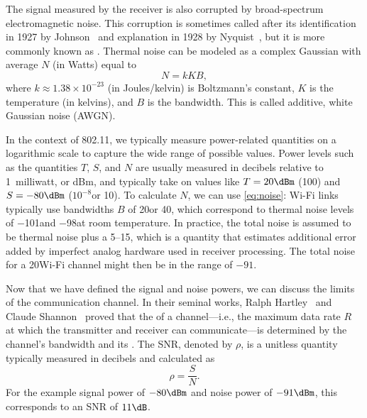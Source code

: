 The signal measured by the receiver is also corrupted by broad-spectrum electromagnetic noise. This corruption is sometimes called  after its identification in 1927 by Johnson~\cite{Johnson_noise} and explanation in 1928 by Nyquist~\cite{Nyquist_noise}, but it is more commonly known as . Thermal noise can be modeled as a complex Gaussian with average  $N$ (in Watts) equal to
\begin{equation}
\label{eq:noise}
N = kKB,
\end{equation}
where $k\approx1.38\times10^{-23}$ (in Joules/kelvin) is Boltzmann's constant, $K$ is the temperature (in kelvins), and $B$ is the bandwidth. This is called additive, white Gaussian noise (AWGN).

In the context of 802.11, we typically measure power-related quantities on a logarithmic scale to capture the wide range of possible values. Power levels such as the quantities $T$, $S$, and $N$ are usually measured in decibels relative to 1~milliwatt, or dBm, and typically take on values like $T=20\dBm$ (100\mW) and $S=-80\dBm$ ($10^{-8}$\mW or 10\pW). To calculate $N$, we can use \eqref{eq:noise}: Wi-Fi links typically use bandwidths $B$ of 20\MHz or 40\MHz, which correspond to thermal noise levels of $-$101\dBm and $-$98\dBm at room temperature. In practice, the total noise is assumed to be thermal noise plus a 5\dB--15\dB {}, which is a quantity that estimates additional error added by imperfect analog hardware used in receiver processing. The total noise for a 20\MHz Wi-Fi channel might then be in the range of $-91$\dBm.

Now that we have defined the signal and noise powers, we can discuss the limits of the communication channel. In their seminal works, Ralph Hartley~\cite{Hartley_law} and Claude Shannon~\cite{Shannon_coding,Shannon_capacity} proved that the  of a channel---i.e., the maximum data rate $R$ at which the transmitter and receiver can communicate---is determined by the channel's bandwidth and its . The SNR, denoted by $\rho$, is a unitless quantity typically measured in decibels and calculated as
\begin{equation}
\rho = \frac{S}{N}.
\end{equation}
For the example signal power of $-80\dBm$ and noise power of $-91\dBm$, this corresponds to an SNR of $11\dB$.


